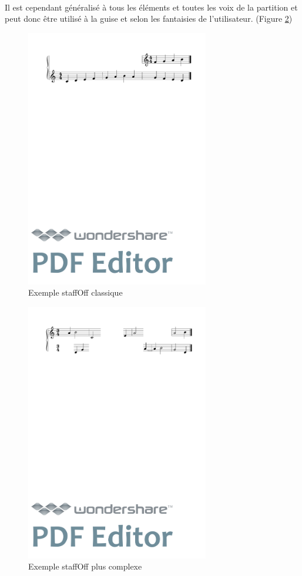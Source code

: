 \documentclass[a4paper,10pt,twocolumn]{article}
\begin{document}
\paragraph{}
Il est cependant généralisé à tous les éléments et toutes les voix de la partition et peut donc être utilisé à la guise et selon les fantaisies de l'utilisateur. (Figure \ref{fig:staffoffexotique})

\begin{figure}[h]
\centering
\includegraphics[width=8cm]{img/staffoff.pdf}
\caption{ Exemple staffOff classique}
\label{fig:staffoffsimple}
\end{figure}


\begin{figure}[h]
\centering
\includegraphics[width=8cm]{img/staffoffexotique.pdf}
\caption{ Exemple staffOff plus complexe}
\label{fig:staffoffexotique}
\end{figure}
\end{document}
